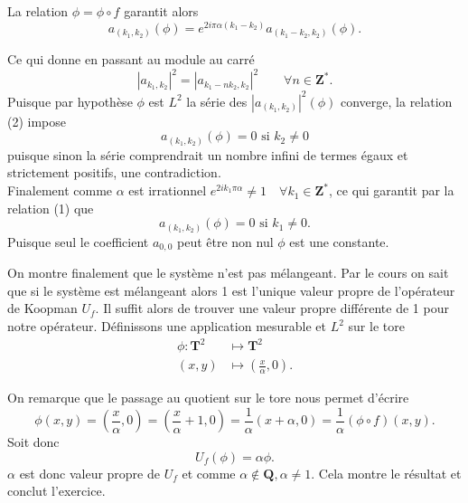 \documentclass[12pt]{article}
\newcommand{\Z}{\mathbf{Z}}
\newcommand{\Q}{\mathbf{Q}}
\newcommand{\T}{\mathbf{T}}
\begin{document}
        La relation $\phi = \phi \circ f$ garantit alors  
        \begin{equation}
                a_{(k_1, k_2)}(\phi) = e^{2i\pi\alpha(k_1-k_2)} a_{(k_1-k_2, k_2)}(\phi).
        \end{equation}

        Ce qui donne en passant au module au carré
        \begin{equation}
                |a_{k_1, k_2}|^2 = |a_{k_1 - nk_2, k_2}|^2 \qquad \forall n \in \Z^{*}.
        \end{equation}
        Puisque par hypothèse $\phi$ est $L^{2}$ la série des $|a_{(k_1, k_2)}|^{2}(\phi)$ converge, la relation (2) impose \[
                a_{(k_1, k_2)}(\phi) = 0 \text{ si  }  k_2 \neq 0
        \] puisque sinon la série comprendrait un nombre infini de termes égaux et strictement positifs, une contradiction. \\

        Finalement comme $\alpha$ est irrationnel $e^{2ik_1\pi\alpha} \neq 1 \quad \forall k_1 \in \Z^{*}$, ce qui garantit par la relation (1) que \[
        a_{(k_1, k_2)}(\phi) = 0 \text{ si  }  k_1 \neq 0
        .\]  Puisque seul le coefficient $a_{0, 0}$ peut être non nul $\phi$ est une constante. 
        \bigskip

        On montre finalement que le système n'est pas mélangeant. Par le cours on sait que si le système est mélangeant alors 1 est l'unique valeur propre de l'opérateur de Koopman $U_{f}$. Il suffit alors de trouver une valeur propre différente de 1 pour notre opérateur. Définissons une application mesurable et $L^{2}$ sur le tore 
        \begin{align*}
                \phi : \T^{2} &\longmapsto \T^{2} \\
                (x, y) &\longmapsto (\frac{x}{\alpha}, 0)
        .\end{align*}

        On remarque que le passage au quotient sur le tore nous permet d'écrire \[
                \phi(x, y) = (\frac{x}{\alpha}, 0) = (\frac{x}{\alpha} + 1, 0) = \frac{1}{\alpha}(x + \alpha, 0) = \frac{1}{\alpha}(\phi \circ f)(x, y)
        .\] 
        Soit donc \[
                U_{f}(\phi) = \alpha\phi
        .\]
        $\alpha$ est donc valeur propre de $U_{f}$ et comme $\alpha \not\in \Q, \alpha \neq 1$. Cela montre le résultat et conclut l'exercice. 
\end{document}
